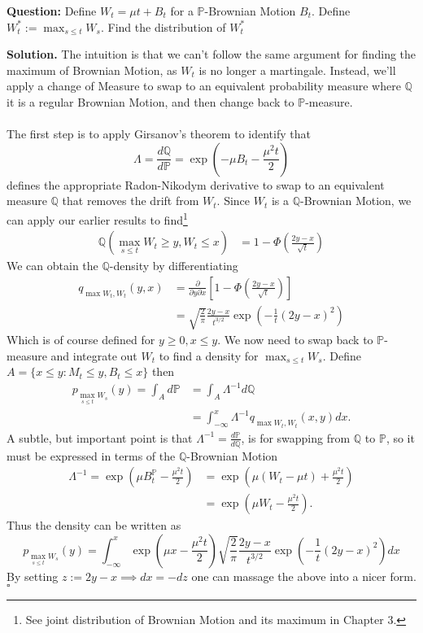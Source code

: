 \documentclass{article}
\begin{document}
\begin{tcolorbox}[colframe=black,colback=gray!5,boxrule=0.5pt]
\textbf{Question:} Define $W_t = \mu t + B_t$ for a $\mathbb{P}$-Brownian Motion $B_t$. Define $W_t^*:=\max_{s\leq t} W_s$. Find the distribution of $W_t^*$
\end{tcolorbox}
\textbf{Solution.} The intuition is that we can't follow the same argument for finding the maximum of Brownian Motion, as $W_t$ is no longer a martingale. Instead, we'll apply a change of Measure to swap to an equivalent probability measure where $\mathbb{Q}$ it is a regular Brownian Motion, and then change back to $\mathbb{P}$-measure. \\
\\
The first step is to apply Girsanov's theorem to identify that 
$$\Lambda = \frac{d\mathbb{Q}}{d\mathbb{P}} = \exp\left(-\mu B_t -\frac{\mu^2 t}{2}\right)$$
defines the appropriate Radon-Nikodym derivative to swap to an equivalent measure $\mathbb{Q}$ that removes the drift from $W_t$. Since $W_t$ is a $\mathbb{Q}$-Brownian Motion, we can apply our earlier results to find\footnote{See joint distribution of Brownian Motion and its maximum in Chapter 3.}
\begin{align*}
    \mathbb{Q}(\max_{s\leq t} W_t\geq y, W_t\leq x) &= 1-\Phi\left(\frac{2y-x}{\sqrt{t}}\right)
\end{align*}
We can obtain the $\mathbb{Q}$-density by differentiating
\begin{align*}
    q_{\max W_t, W_t}(y,x) &= \frac{\partial}{\partial y\partial x} \left[1-\Phi\left(\frac{2y-x}{\sqrt{t}}\right)\right] \\
    &= \sqrt{\frac{2}{\pi}}\frac{2y-x}{t^{3/2}}\exp\left(-\frac{1}{t}(2y-x)^2\right)
\end{align*}
Which is of course defined for $y\geq 0, x\leq y$. We now need to swap back to $\mathbb{P}$-measure and integrate out $W_t$ to find a density for $\max_{s\leq t} W_s$. Define $A = \{x\leq y: M_t{\leq y, B_{t}\leq x}\}$ then 
\begin{align*}
    p_{\max_{s\leq t}W_s}(y) = \int_Ad\mathbb{P} &= \int_A\Lambda^{-1}d\mathbb{Q} \\
    &= \int_{-\infty}^{x}\Lambda^{-1}q_{\max W_t, W_t}(x,y)dx.
\end{align*}
A subtle, but important point is that $\Lambda^{-1} = \frac{d\mathbb{P}}{d\mathbb{Q}}$, is for swapping from $\mathbb{Q}$ to $\mathbb{P}$, so it must be expressed in terms of the $\mathbb{Q}$-Brownian Motion
\begin{align*}
    \Lambda^{-1} = \exp\left(\mu B_t^\mathbb{P} - \frac{\mu^2 t}{2}\right) &= \exp\left(\mu (W_t-\mu t) + \frac{\mu^2 t}{2}\right) \\
    &=\exp\left(\mu W_t - \frac{\mu^2 t}{2}\right).
\end{align*}
Thus the density can be written as 
$$p_{\max_{s\leq t}W_s}(y) = \int_{-\infty}^x \exp\left(\mu x - \frac{\mu^2 t}{2}\right)\sqrt{\frac{2}{\pi}}\frac{2y-x}{t^{3/2}}\exp\left(-\frac{1}{t}(2y-x)^2\right)dx$$
By setting $z:= 2y-x \implies dx=-dz$ one can massage the above into a nicer form. $\square$
\end{document}
